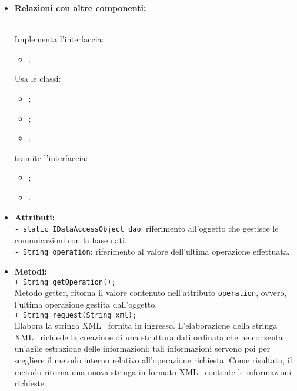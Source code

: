 {{\begin{sloppypar}
{{{\begin{itemize}
				\item[] \textbf{Relazioni con altre componenti:}{\\			
					Implementa l'interfaccia:
						\begin{itemize}
							\item[] .
						\end{itemize}
					Usa le classi:
						\begin{itemize}
							\item[] ;
							\item[] ;
							\item[] .
						\end{itemize}
					tramite l'interfaccia:
						\begin{itemize}
							\item[]	;
							\item[] .\\
						\end{itemize}
				}
				
				\item[] \textbf{Attributi:}{\\
					\texttt{- static IDataAccessObject dao}: riferimento all'oggetto  che gestisce le comunicazioni con la base dati.\\
					
					\texttt{- String operation}: riferimento al valore dell'ultima operazione effettuata.\\
				}
			
				\item[] \textbf{Metodi:}{\\
					\texttt{+ String getOperation();}\\
					Metodo getter, ritorna il valore contenuto nell'attributo \texttt{operation}, ovvero, l'ultima operazione gestita dall'oggetto.\\	
					
					\texttt{+ String request(String xml);}\\
					Elabora la stringa XML\g~ fornita in ingresso.
					L'elaborazione della stringa XML\g~ richiede la creazione di una struttura dati ordinata che ne consenta un'agile estrazione delle informazioni; tali informazioni servono poi per scegliere il metodo interno relativo all'operazione richiesta.
					Come risultato, il metodo ritorna una nuova stringa in formato XML\g~ contente le informazioni richieste.\\
					
}
\end{itemize}}}}
\end{sloppypar}}}
